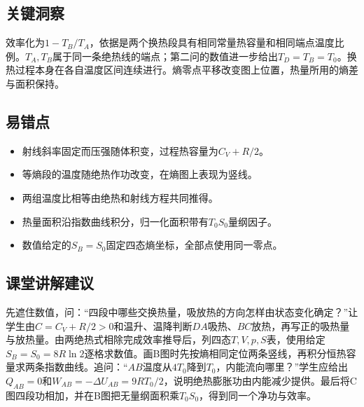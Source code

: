 \documentclass[UTF8,fontset=fandol,a4paper,11pt]{ctexart}
\begin{document}

\subsection*{关键洞察}

效率化为$1-T_B/T_A$，依据是两个换热段具有相同常量热容量和相同端点温度比例。$T_A,T_B$属于同一条绝热线的端点；第二问的数值进一步给出$T_D=T_B=T_0$。换热过程本身在各自温度区间连续进行。熵零点平移改变图上位置，热量所用的熵差与面积保持。



\subsection*{易错点}

\begin{itemize}
\item 射线斜率固定而压强随体积变，过程热容量为$C_V+R/2$。
\item 等熵段的温度随绝热作功改变，在熵图上表现为竖线。
\item 两组温度比相等由绝热和射线方程共同推得。
\item 热量面积沿指数曲线积分，归一化面积带有$T_0S_0$量纲因子。
\item 数值给定的$S_B=S_0$固定四态熵坐标，全部点使用同一零点。\end{itemize}



\subsection*{课堂讲解建议}

先遮住数值，问：“四段中哪些交换热量，吸放热的方向怎样由状态变化确定？”让学生由$C=C_V+R/2>0$和温升、温降判断$DA$吸热、$BC$放热，再写正的吸热量与放热量。由两绝热式相除完成效率推导后，列四态$T,V,p,S$表，使用给定$S_B=S_0=8R\ln2$逐格求数值。画B图时先按熵相同定位两条竖线，再积分恒热容量求两条指数曲线。追问：“$AB$温度从$4T_0$降到$T_0$，内能流向哪里？”学生应给出$Q_{AB}=0$和$W_{AB}=-\Delta U_{AB}=9RT_0/2$，说明绝热膨胀功由内能减少提供。最后将C图四段功相加，并在B图把无量纲面积乘$T_0S_0$，得到同一个净功与效率。


\end{document}
